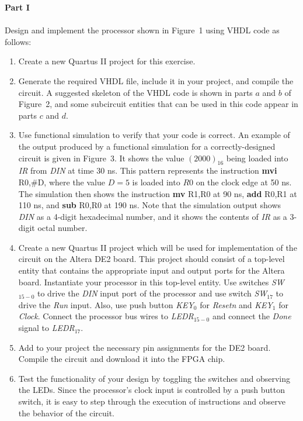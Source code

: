 \documentclass[epsfig,10pt,fullpage]{article}
\begin{document}
\pagebreak
\noindent
{\bf Part I}
~\\
~\\
\noindent
Design and implement the processor shown in Figure~1 using VHDL code as follows:
\begin{enumerate}
\item Create a new Quartus II project for this exercise.
\item Generate the required VHDL file, include it in your project, 
and compile the circuit. A suggested skeleton of the VHDL code is shown in parts $a$ and
$b$ of Figure~2,
and some subcircuit entities that can be used in this code appear in parts $c$ and $d$.
\item Use functional simulation to verify that your code is correct. An example of the output
produced by a functional simulation for a correctly-designed circuit is given in Figure~3.
It shows the value ${(2000)}_{16}$ being loaded into {\it IR} from {\it DIN} at time 30 ns. This
pattern represents the instruction {\bf mvi} R0,\#D, where the value $D = 5$ is loaded
into $R0$ on
the clock edge at 50 ns. The simulation then shows the instruction {\bf mv} R1,R0 at 90
ns, {\bf add} R0,R1 at 110 ns, and {\bf sub} R0,R0 at 190 ns. 
Note that the simulation output shows {\it DIN} as a 4-digit
hexadecimal number, and it shows the contents of {\it IR} as a 3-digit octal number.
\item Create a new Quartus II project which will be used for implementation of the 
circuit on the Altera DE2 board. This project should consist of a top-level entity that
contains the appropriate input and output ports for the Altera board. Instantiate your
processor in this top-level entity. Use switches {\it SW}$_{15-0}$ to drive the {\it DIN} input 
port of the processor and use switch {\it SW}$_{17}$ to drive the {\it Run} input. Also, use 
push button {\it KEY}$_0$ for {\it Resetn} and {\it KEY}$_1$ for {\it Clock}.
Connect the processor bus wires to {\it LEDR}$_{15-0}$ and connect the {\it Done} signal to
{\it LEDR}$_{17}$.
\item Add to your project the necessary pin assignments for the 
DE2 board.  Compile the circuit and download it into the FPGA chip.
\item Test the functionality of your design by toggling the switches
and observing the LEDs. Since the processor's clock input is controlled by a push button
switch, it is easy to step through the execution of instructions and observe the behavior
of the circuit.
\end{enumerate}
\end{document}
